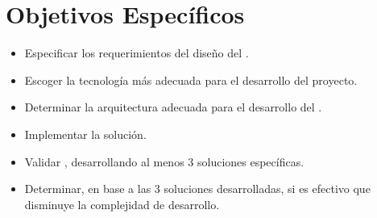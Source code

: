 
\section{Objetivos Específicos}\label{cap:intro:objetivos}
\begin{itemize}
	\item Especificar los requerimientos del diseño del \frameworkPC.
	\item Escoger la tecnología más adecuada para el desarrollo del proyecto.
	\item Determinar la arquitectura adecuada para el desarrollo del \frameworkPC.
	\item Implementar la solución.
	\item Validar \frameworkPC, desarrollando al menos 3 soluciones específicas.
	\item Determinar, en base a las 3 soluciones desarrolladas, si es efectivo que \frameworkPC disminuye la complejidad de desarrollo. 
\end{itemize}

%